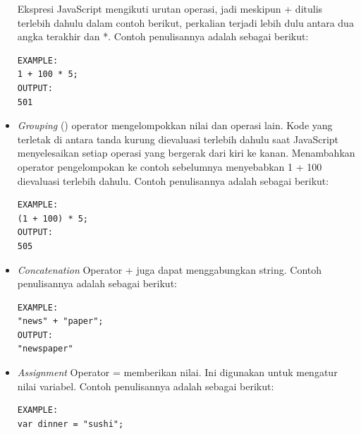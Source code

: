 \begin{itemize}
            Ekspresi JavaScript mengikuti urutan operasi, jadi meskipun + ditulis terlebih dahulu dalam contoh berikut, perkalian terjadi lebih dulu antara dua angka terakhir dan *. Contoh penulisannya adalah sebagai berikut: 
        \begin{lstlisting}[basicstyle=\ttfamily, frame=single,
    columns=fullflexible, breaklines=true, numbers=none]
EXAMPLE:
1 + 100 * 5;
OUTPUT:
501
        \end{lstlisting}
        \item \textit{Grouping} \newline
        () operator mengelompokkan nilai dan operasi lain. Kode yang terletak di antara tanda kurung dievaluasi terlebih dahulu saat JavaScript menyelesaikan setiap operasi yang bergerak dari kiri ke kanan. Menambahkan operator pengelompokan ke contoh sebelumnya menyebabkan 1 + 100 dievaluasi terlebih dahulu. Contoh penulisannya adalah sebagai berikut: 
        \begin{lstlisting}[basicstyle=\ttfamily, frame=single,
    columns=fullflexible, breaklines=true, numbers=none]
EXAMPLE:
(1 + 100) * 5;
OUTPUT:
505
        \end{lstlisting}
        \item \textit{Concatenation} \newline
        Operator + juga dapat menggabungkan string. Contoh penulisannya adalah sebagai berikut: 
        \begin{lstlisting}[basicstyle=\ttfamily, frame=single,
    columns=fullflexible, breaklines=true, numbers=none]
EXAMPLE:
"news" + "paper";
OUTPUT:
"newspaper"
        \end{lstlisting}
        \item \textit{Assignment} \newline
        Operator = memberikan nilai. Ini digunakan untuk mengatur nilai variabel. Contoh penulisannya adalah sebagai berikut: 
        \begin{lstlisting}[basicstyle=\ttfamily, frame=single,
    columns=fullflexible, breaklines=true, numbers=none]
EXAMPLE:
var dinner = "sushi";
        \end{lstlisting}
    \end{itemize}

